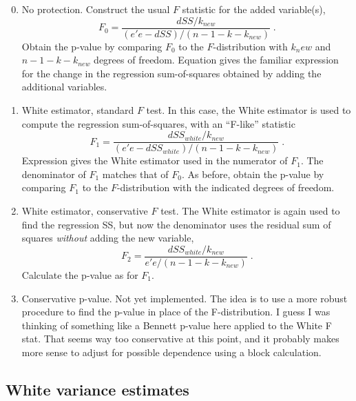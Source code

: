 \documentclass[12pt]{article}
\begin{document}
\begin{enumerate}
\setcounter{enumi}{-1}

\item No protection.  Construct the usual $F$ statistic for the added
 variable(s),
\begin{equation}
    F_0 = \frac{ dSS/k_{new} }{(e'e-dSS)/(n-1-k-k_{new})} \;.
\label{eq:f0}
\end{equation}
 Obtain the p-value by comparing $F_0$ to the $F$-distribution with $k_new$ and
 $n-1-k-k_{new}$ degrees of freedom.  Equation  gives the familiar
 expression for the change in the regression sum-of-squares obtained by adding
 the additional variables.

\item White estimator, standard $F$ test. In this case, the White estimator is
 used to compute the regression sum-of-squares, with an ``F-like'' statistic
\begin{equation}
    F_1 = \frac{ dSS_{white}/k_{new} }{(e'e-dSS_{white})/(n-1-k-k_{new})} \;.
\label{eq:f1}
\end{equation}
 Expression  gives the White estimator used in the numerator of
 $F_1$.  The denominator of $F_1$ matches that of $F_0$.  As before, obtain the
 p-value by comparing $F_1$ to the $F$-distribution with the indicated degrees
 of freedom.

\item White estimator, conservative $F$ test. The White estimator is again used
 to find the regression SS, but now the denominator uses the residual sum of
 squares {\em without} adding the new variable,
\begin{equation}
    F_2 = \frac{ dSS_{white}/k_{new} }{e'e/(n-1-k-k_{new})} \;.
\label{eq:fstat}
\end{equation}
 Calculate the p-value as for $F_1$.

\item Conservative p-value.  Not yet implemented.  The idea is to use a more
 robust procedure to find the p-value in place of the F-distribution.  I guess I
 was thinking of something like a Bennett p-value here applied to the White F
 stat.  That seems way too conservative at this point, and it probably makes
 more sense to adjust for possible dependence using a block calculation.

\end{enumerate}

\subsection{White variance estimates} %
\end{document}
